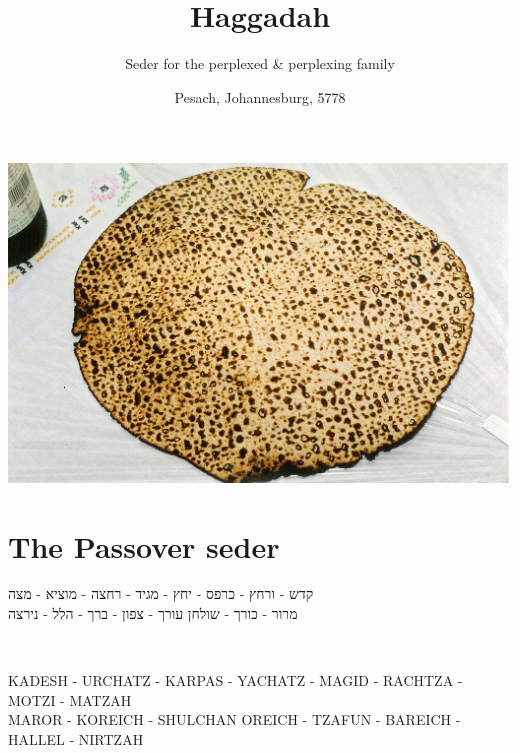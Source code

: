 \documentclass[extrafontsizes,twoside,17pt,a4paper,openany]{memoir}
\title{\vspace*{-4cm}Haggadah}
\author{\vspace*{-1cm}Seder for the perplexed \& perplexing family}
\date{Pesach, Johannesburg, 5778}
\newcommand{\CH}{CH}
\newenvironment{HgHebrew}{\begin{hebrew}\noindent\large}{\end{hebrew}}
\newenvironment{HgTranslit}{\strut\\\noindent\begin{itshape}}{\end{itshape}\vspace{1em}}
\begin{document}
\frontmatter
{}\afterpage{\restorepagecolor}
\maketitle

\thispagestyle{empty}
\pagestyle{plain}


\noindent\hspace*{-5cm}
\vspace*{-3cm}
\includegraphics[width=242mm]{figs/matzo.jpg}
\thispagestyle{empty}



\newpage

\phantom{Deliberately blank}
\thispagestyle{empty}

\newpage
\setcounter{page}{1}
\maketitle


\chapter{The Passover seder}

\vfill

\vspace{-2em}
\begin{HgHebrew}
  \begin{center}
  קדש 
  -
  ורחץ
  -
  כרפס 
  -
  יחץ 
  -
  מגיד 
  -
  רחצה 
  -
  מוציא
  -
  מצה 
  \\
  מרור 
  -
  כורך 
  -
  שולחן עורך 
  -
  צפון
  -
  ברך 
  -
  הלל 
  -
  נירצה 
  \end{center}
\end{HgHebrew}
\vspace{-3em}
\begin{HgTranslit}
  \begin{center}
  {\small 
    KADESH - UR{\CH}ATZ - KARPAS - YA{\CH}ATZ - %
    MAGID - RA{\CH}TZA - MOTZI - MATZAH \\ 
    MAROR - KOREI{\CH} - SHUL{\CH}AN OREI{\CH} - %
    TZAFUN - BAREI{\CH} - HALLEL - NIRTZAH}
  \end{center}
\end{HgTranslit}
\end{document}
